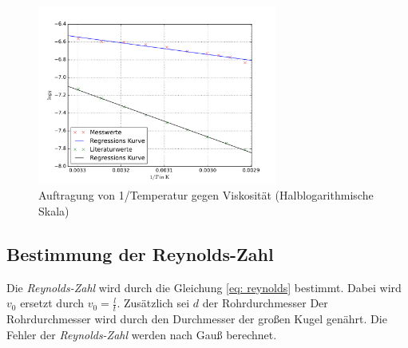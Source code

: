 \begin{figure}
\centering
\includegraphics[width=0.7\textwidth]{pics/viskositaet_temp__log_mit_lit.pdf}
\caption{ Auftragung von 1/Temperatur gegen Viskosität (Halblogarithmische Skala)} %
\label{fig:t_v_l_v}
\end{figure}
\FloatBarrier



\subsection{Bestimmung der Reynolds-Zahl}

Die \emph{Reynolds-Zahl} wird durch die Gleichung \eqref{eq: reynolds} bestimmt.
Dabei wird $v_0$ ersetzt durch $v_0=\frac{l}{t}$.
Zusätzlich sei $d$ der Rohrdurchmesser  %
Der Rohrdurchmesser wird durch den Durchmesser der großen Kugel genährt.
Die Fehler der \emph{Reynolds-Zahl} werden nach Gauß berechnet. %



